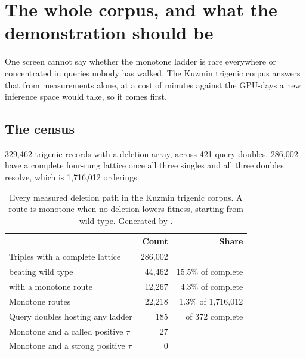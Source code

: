 
\section{The whole corpus, and what the demonstration should be}

One screen cannot say whether the monotone ladder is rare everywhere or
concentrated in queries nobody has walked. The Kuzmin trigenic corpus answers
that from measurements alone, at a cost of minutes against the GPU-days a new
inference space would take, so it comes first.

\subsection{The census}

329{,}462 trigenic records with a deletion array, across 421 query doubles.
286{,}002 have a complete four-rung lattice once all three singles and all three
doubles resolve, which is 1{,}716{,}012 orderings.

\begin{table}[H]
\centering
\footnotesize
\begin{tabular}{lrr}
\toprule
& Count & Share \\
\midrule
Triples with a complete lattice     & 286{,}002 & \\
\quad beating wild type             & 44{,}462  & 15.5\% of complete \\
\quad with a monotone route         & 12{,}267  & 4.3\% of complete \\
Monotone routes                     & 22{,}218  & 1.3\% of 1{,}716{,}012 \\
Query doubles hosting any ladder    & 185       & of 372 complete \\
Monotone and a called positive $\tau$ & 27      & \\
Monotone and a strong positive $\tau$ & 0       & \\
\bottomrule
\end{tabular}
\caption{Every measured deletion path in the Kuzmin trigenic corpus. A route is
monotone when no deletion lowers fitness, starting from wild type. Generated by
\protect{}.}
\end{table}

